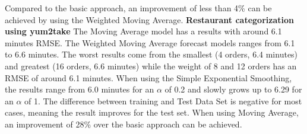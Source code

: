 Compared to the basic approach, an improvement of less than 4\% can be achieved by using the Weighted Moving Average.
\newline\newline\textbf{Restaurant categorization using yum2take}\newline
 The Moving Average model has a results with around 6.1 minutes RMSE. The Weighted Moving Average forecast models ranges from 6.1 to 6.6 minutes. The worst results come from the smallest (4 orders, 6.4 minutes) and greatest (16 orders, 6.6 minutes) while the weight of 8 and 12 orders has an RMSE of around 6.1 minutes. When using the Simple Exponential Smoothing, the results range from 6.0 minutes for an $\alpha$ of 0.2 and slowly grows up to 6.29 for an $\alpha$ of 1. The difference between training and Test Data Set is negative for most cases, meaning the result improves for the test set.\newline
 When using Moving Average, an improvement of 28\% over the basic approach can be achieved.
